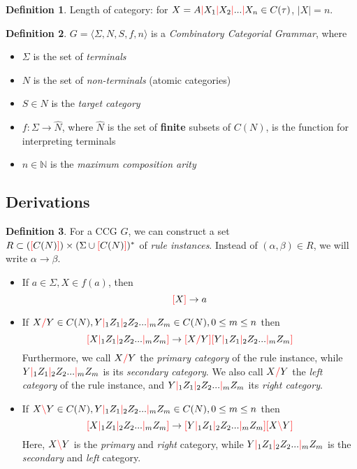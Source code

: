 \documentclass[12pt]{extarticle}
\theoremstyle{definition} \newtheorem{defn}{Definition}
\theoremstyle{definition} \newtheorem{prop}{Proposition}
\theoremstyle{definition} \newtheorem{property}{Property}
\newcommand{\lc}{\textcolor{red}{\backslash}}
\newcommand{\rc}{\textcolor{red}{/}}
\newcommand{\mc}{\textcolor{red}{|}}
\newcommand{\lb}{\textcolor{red}{[}}
\newcommand{\rb}{\textcolor{red}{]}}
\begin{document}
\begin{defn}
    Length of category: for $X = A \mc X_1 \mc X_2 \mc ... \mc X_n \in C(\tau)$,
    $|X| = n$.
\end{defn}

\begin{defn}
    $ G = \langle \Sigma, N, S, f, n \rangle $ is a \emph{Combinatory Categorial Grammar}, where
    \begin{itemize}
        \item $ \Sigma $ is the set of \emph{terminals}
        \item $ N $ is the set of \emph{non-terminals} (atomic categories)
        \item $ S \in N $ is the \emph{target category}
        \item $ f : \Sigma \rightarrow \hat{N} $, where $\hat{N}$ is the set of
            \textbf{finite} subsets of $C(N)$, is the function for interpreting
            terminals
        \item $ n \in \mathbb{N} $ is the \emph{maximum composition arity}
    \end{itemize}
\end{defn}

\subsection{Derivations}

\begin{defn}
    For a CCG $G$, we can construct a set $R \subset (\lb C(N) \rb) \times (\Sigma \cup \lb C(N) \rb)^*$
    of \emph{rule instances}. Instead of $(\alpha, \beta) \in R$, we will write
    $\alpha \rightarrow \beta$.

    \begin{itemize}
        \item If $ a \in \Sigma, X \in f(a) $, then \[ \lb X \rb \rightarrow a \]
        \item If $ X \rc Y \in C(N), Y \mc_1 Z_1 \mc_2 Z_2 ... \mc_m Z_m \in C(N), 0 \leq m \leq n $
            then \[ \lb X \mc_1 Z_1 \mc_2 Z_2 ... \mc_m Z_m \rb \rightarrow \lb X \rc Y \rb \lb Y \mc_1 Z_1 \mc_2 Z_2 ... \mc_m Z_m \rb \]
            Furthermore, we call $ X \rc Y $ the \emph{primary category} of the rule
            instance, while $ Y \mc_1 Z_1 \mc_2 Z_2 ... \mc_m Z_m $ is its
            \emph{secondary category}.
            We also call $ X \rc Y $ the \emph{left category} of the rule instance,
            and $  Y \mc_1 Z_1 \mc_2 Z_2 ... \mc_m Z_m $ its \emph{right category}.
        \item If $ X \lc Y \in C(N), Y \mc_1 Z_1 \mc_2 Z_2 ... \mc_m Z_m \in C(N), 0 \leq m \leq n $
            then \[ \lb X \mc_1 Z_1 \mc_2 Z_2 ... \mc_m Z_m \rb \rightarrow \lb Y \mc_1 Z_1 \mc_2 Z_2 ... \mc_m Z_m \rb \lb X \lc Y \rb \]
            Here, $ X \lc Y $ is the \emph{primary} and \emph{right} category,
            while $ Y \mc_1 Z_1 \mc_2 Z_2 ... \mc_m Z_m $ is the \emph{secondary}
            and \emph{left} category.
    \end{itemize}
\end{defn}
\end{document}
